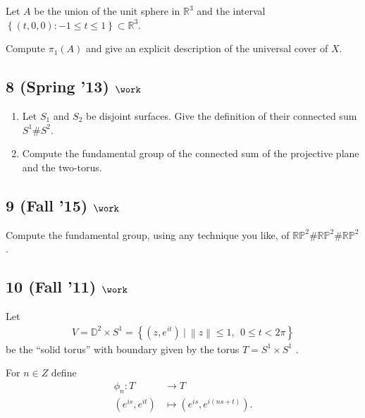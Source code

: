 Let \(A\) be the union of the unit sphere in \({\mathbb{R}}^3\) and the
interval
\(\left\{{(t, 0, 0) : -1 \leq t \leq 1}\right\} \subset {\mathbb{R}}^3\).

Compute \(\pi_1 (A)\) and give an explicit description of the universal
cover of \(X\).

\hypertarget{spring-13-work-1}{%
\subsection{\texorpdfstring{8 (Spring '13)
\(\work\)}{8 (Spring '13) \textbackslash work}}\label{spring-13-work-1}}

\begin{enumerate}
\def\labelenumi{\alph{enumi}.}
\item
  Let \(S_1\) and \(S_2\) be disjoint surfaces. Give the definition of
  their connected sum \(S^1 \#S^2\).
\item
  Compute the fundamental group of the connected sum of the projective
  plane and the two-torus.
\end{enumerate}

\hypertarget{fall-15-work}{%
\subsection{\texorpdfstring{9 (Fall '15)
\(\work\)}{9 (Fall '15) \textbackslash work}}\label{fall-15-work}}

Compute the fundamental group, using any technique you like, of
\({\mathbb{RP}}^2 \#{\mathbb{RP}}^2 \#{\mathbb{RP}}^2\).

\hypertarget{fall-11-work-1}{%
\subsection{\texorpdfstring{10 (Fall '11)
\(\work\)}{10 (Fall '11) \textbackslash work}}\label{fall-11-work-1}}

Let
\begin{align*}
V = {\mathbb{D}}^2 \times S^1 = \left\{{ (z, e^{it}) {~\mathrel{\Big|}~}{\left\lVert {z} \right\rVert} \leq 1,~~ 0 \leq t < 2\pi}\right\}
\end{align*}
be the ``solid torus'' with boundary given by the torus
\(T = S^1 \times S^1\) .

For \(n \in Z\) define
\begin{align*} \phi_n : T &\to T \\ (e^{is} , e^{it} ) &\mapsto (e^{is} , e^{i(ns+t)}) .\end{align*}

